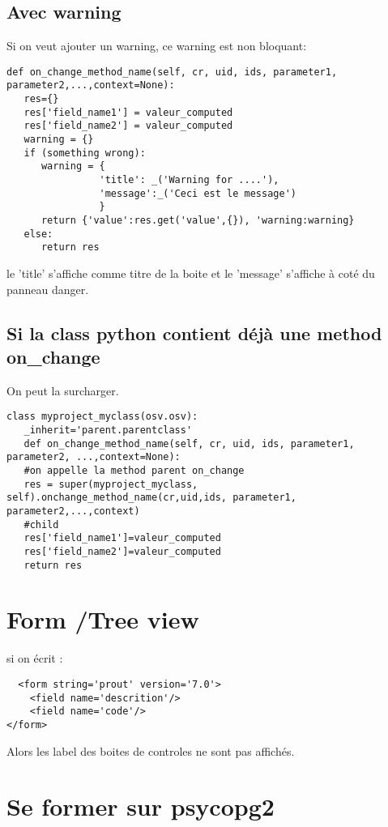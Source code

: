 \documentclass[12pt,a4paper]{article}
\begin{document}
\subsection{Avec warning}
\label{sec:warning}
Si on veut ajouter un warning, ce warning est non bloquant:
\begin{verbatim}
def on_change_method_name(self, cr, uid, ids, parameter1, parameter2,...,context=None):
   res={}
   res['field_name1'] = valeur_computed
   res['field_name2'] = valeur_computed
   warning = {}
   if (something wrong):
      warning = {
                'title': _('Warning for ....'),
                'message':_('Ceci est le message')
                }
      return {'value':res.get('value',{}), 'warning:warning}
   else:
      return res
\end{verbatim}
le 'title' s'affiche comme titre de la boite et le 'message' s'affiche à coté du panneau danger.
\subsection{Si la class python contient déjà une method on\_change}
\label{sec:override}

On peut la surcharger.
\begin{verbatim}
class myproject_myclass(osv.osv):
   _inherit='parent.parentclass'
   def on_change_method_name(self, cr, uid, ids, parameter1, parameter2, ...,context=None):
   #on appelle la method parent on_change
   res = super(myproject_myclass, self).onchange_method_name(cr,uid,ids, parameter1, parameter2,...,context)
   #child
   res['field_name1']=valeur_computed
   res['field_name2']=valeur_computed
   return res
\end{verbatim}


\section{Form /Tree view}
\label{sec:views}

si on écrit : 
\begin{verbatim}
  <form string='prout' version='7.0'> 
    <field name='descrition'/> 
    <field name='code'/> 
</form>
\end{verbatim}


Alors les label des boites de controles ne sont pas affichés. 



\section{Se former sur psycopg2}
\label{psycopg2}
\end{document}
